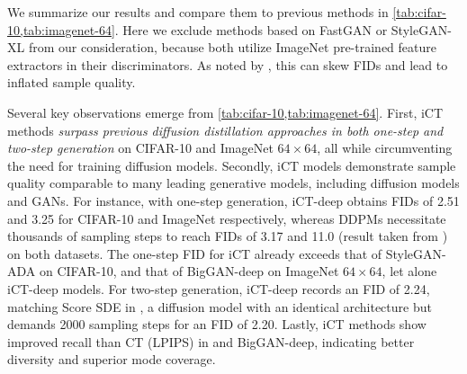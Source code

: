 We summarize our results and compare them to previous methods in \cref{tab:cifar-10,tab:imagenet-64}. Here we exclude methods based on FastGAN \citep{liu2020towards,sauer2021projected} or StyleGAN-XL \citep{sauer2022stylegan} from our consideration, because both utilize ImageNet pre-trained feature extractors in their discriminators. As noted by \citet{kynkanniemi2023the}, this can skew FIDs and lead to inflated sample quality.

Several key observations emerge from \cref{tab:cifar-10,tab:imagenet-64}. First, iCT methods \emph{surpass previous diffusion distillation approaches in both one-step and two-step generation} on CIFAR-10 and ImageNet $64\times 64$, all while circumventing the need for training diffusion models. Secondly, iCT models demonstrate sample quality comparable to many leading generative models, including diffusion models and GANs. For instance, with one-step generation, iCT-deep obtains FIDs of 2.51 and 3.25 for CIFAR-10 and ImageNet respectively, whereas DDPMs \citep{ho2020denoising} necessitate thousands of sampling steps to reach FIDs of 3.17 and 11.0 (result taken from \citet{gu2023boot}) on both datasets. The one-step FID for iCT already exceeds that of StyleGAN-ADA \citep{karras2020analyzing} on CIFAR-10, and that of BigGAN-deep \citep{brock2018large} on ImageNet $64\times 64$, let alone iCT-deep models. For two-step generation, iCT-deep records an FID of 2.24, matching Score SDE in \citet{song2021scorebased}, a diffusion model with an identical architecture but demands 2000 sampling steps for an FID of 2.20. Lastly, iCT methods show improved recall than CT (LPIPS) in \citet{song2023consistency} and BigGAN-deep, indicating better diversity and superior mode coverage.

